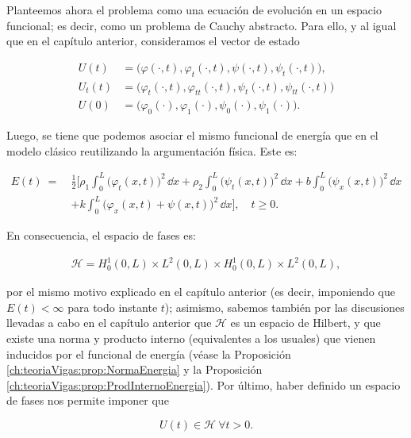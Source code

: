 Planteemos ahora el problema como una ecuación de evolución en un espacio funcional; es decir, como un problema de Cauchy abstracto. Para ello, y al igual que en el capítulo anterior, consideramos el vector de estado

\begin{align*}
    U(t) &= \big(\varphi(\cdot, t), \varphi_t(\cdot, t), \psi(\cdot, t), \psi_t(\cdot,t) \big),\\
    U_t(t) &= \big(\varphi_t(\cdot, t), \varphi_{tt}(\cdot, t), \psi_t(\cdot, t), \psi_{tt}(\cdot,t) \big)\\
    U(0) &= \big(\varphi_0(\cdot), \varphi_1(\cdot), \psi_0(\cdot), \psi_1(\cdot) \big).
\end{align*}

Luego, se tiene que podemos asociar el mismo funcional de energía que en el modelo clásico reutilizando la argumentación física. Este es:

\begin{equation}
    \label{timoshenkoDosAmortig:funcionalEnergia}
    \begin{aligned}
        E(t) \ = \  &\frac{1}{2} \Bigg[ \rho_1 \int_0^L \big(\varphi_t(x,t) \big)^2 \, \dd x + \rho_2 \int_0^L \big(\psi_t(x,t) \big)^2 \, \dd x + b\int_0^L \big(\psi_x(x,t) \big)^2 \, \dd x\\
        &+ k\int_0^L \big(\varphi_x(x,t) + \psi(x,t) \big)^2 \, \dd x \Bigg], \quad t \geq 0.
    \end{aligned}
\end{equation}

En consecuencia, el espacio de fases es:

\begin{align}
    \mathcal{H} = H_0^1(0,L) \times L^2(0,L) \times H_0^1(0,L) \times L^2(0,L),\label{espacioDeFaseTimoshenkoDosDisip}
\end{align}

por el mismo motivo explicado en el capítulo anterior (es decir, imponiendo que $E(t) < \infty$ para todo instante $t$); asimismo, sabemos también por las discusiones llevadas a cabo en el capítulo anterior que $\mathcal{H}$ es un espacio de Hilbert, y que existe una norma y producto interno (equivalentes a los usuales) que vienen inducidos por el funcional de energía (véase la Proposición \ref{ch:teoriaVigas:prop:NormaEnergia} y la Proposición \ref{ch:teoriaVigas:prop:ProdInternoEnergia}). Por último, haber definido un espacio de fases nos permite imponer que

\[U(t) \in \mathcal{H} \ \forall t > 0.\]

